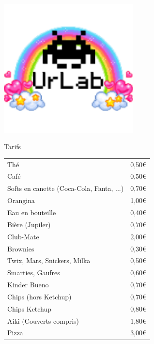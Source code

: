 \documentclass[a4paper,12pt]{article}
\begin{document}
\parindent0pt
\begin{center}
\includegraphics[width=200pt]{urlab.png}

 \Huge Tarifs
\end{center}

\LARGE
\begin{tabular}{ | l | l |}
  \hline
  Thé & 0,50\euro \\
  Café & 0,50\euro \\
  Softs en canette (Coca-Cola, Fanta, ...) & 0,70\euro \\
  Orangina & 1,00\euro \\
  Eau en bouteille & 0,40\euro \\
  Bière (Jupiler) & 0,70\euro \\
  Club-Mate & 2,00\euro \\
  \hline
  Brownies & 0,30\euro \\
  Twix, Mars, Snickers, Milka & 0,50\euro \\
  Smarties, Gaufres & 0,60\euro \\
  Kinder Bueno & 0,70\euro \\
  Chips (hors Ketchup) & 0,70\euro \\
  Chips Ketchup & 0,80\euro \\
  \hline
  Aiki (Couverts compris) & 1,80\euro \\
  Pizza & 3,00\euro \\
  \hline

  \hline
\end{tabular}
\end{document}
